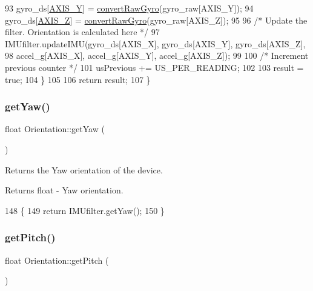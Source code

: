 \begin{DoxyCode}
93     gyro\_ds[\hyperlink{_orientation_8cpp_a08f3e26d90cf66bf2840d476e5d4711f}{AXIS\_Y}] = \hyperlink{class_orientation_a99bb5ed3c3226c5d636fa48f26f491dd}{convertRawGyro}(gyro\_raw[AXIS\_Y]);
94     gyro\_ds[\hyperlink{_orientation_8cpp_a220ebc22eb87c8989bfd63ae3cbbe2a8}{AXIS\_Z}] = \hyperlink{class_orientation_a99bb5ed3c3226c5d636fa48f26f491dd}{convertRawGyro}(gyro\_raw[AXIS\_Z]);
95 
96     \textcolor{comment}{/* Update the filter. Orientation is calculated here */}
97     IMUfilter.updateIMU(gyro\_ds[AXIS\_X], gyro\_ds[AXIS\_Y], gyro\_ds[AXIS\_Z],
98                         accel\_g[AXIS\_X], accel\_g[AXIS\_Y], accel\_g[AXIS\_Z]);
99 
100     \textcolor{comment}{/* Increment previous counter */}
101     usPrevious += US\_PER\_READING;
102 
103     result = \textcolor{keyword}{true};
104   \}
105 
106   \textcolor{keywordflow}{return} result;
107 \}
\end{DoxyCode}
\mbox{\label{class_orientation_a3dbaa1ee014811c40d5b9f39b544c19b}} 
\subsubsection{\texorpdfstring{get\+Yaw()}{getYaw()}}
{\footnotesize\ttfamily float Orientation\+::get\+Yaw (\begin{DoxyParamCaption}{ }\end{DoxyParamCaption})}



Returns the Yaw orientation of the device. 

\begin{DoxyReturn}{Returns}
float -\/ Yaw orientation. 
\end{DoxyReturn}

\begin{DoxyCode}
148 \{
149   \textcolor{keywordflow}{return} IMUfilter.getYaw();
150 \}
\end{DoxyCode}
\mbox{\label{class_orientation_a7ec1a2964fc858bbd5da22a505b087c8}} 
\subsubsection{\texorpdfstring{get\+Pitch()}{getPitch()}}
{\footnotesize\ttfamily float Orientation\+::get\+Pitch (\begin{DoxyParamCaption}{ }\end{DoxyParamCaption})}



